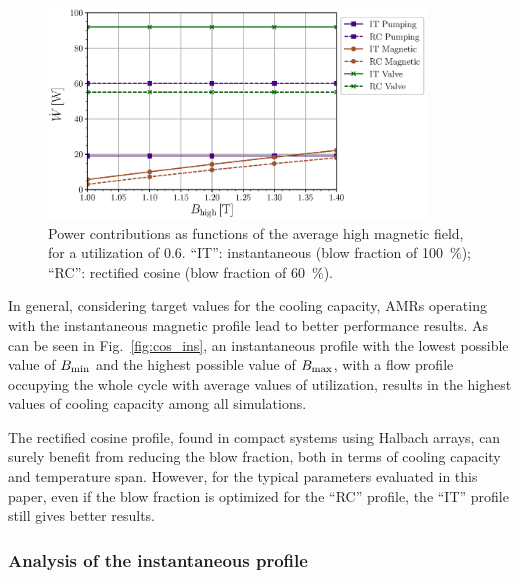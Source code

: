 \documentclass[referee]{svjour3}
\begin{document}
\begin{figure}[!ht]
  \centering
  \includegraphics[width=10cm]{Fig9-W_B_comp_f_1_Phi_60_same_minimum}
  \caption{Power contributions as functions of the average high magnetic field, for a utilization of 0.6. ``IT'': instantaneous (blow fraction of \SI{100}{\percent}); ``RC'': rectified cosine  (blow fraction of \SI{60}{\percent}).}
  \label{fig:cos_ins_w}
\end{figure}

In general, considering target values for the cooling capacity, AMRs operating with the instantaneous magnetic profile lead to better performance results. As can be seen in Fig.~\ref{fig:cos_ins}, an instantaneous profile with the lowest possible value of $B_{\mathrm{min}}$ and the highest possible value of $B_{\mathrm{max}}$, with a flow profile occupying the whole cycle with average values of utilization, results in the highest values of cooling capacity among all simulations. 

The rectified cosine profile, found in compact systems using Halbach arrays, can surely benefit from reducing the blow fraction, both in terms of cooling capacity and temperature span. However, for the typical parameters evaluated in this paper, even if the blow fraction is optimized for the ``RC'' profile, the ``IT'' profile still gives better results.

\subsubsection{Analysis of the instantaneous profile}
\label{sec:deta-analys-inst}
\end{document}
